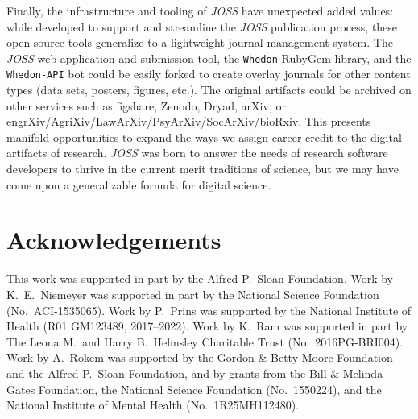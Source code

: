 \documentclass{article}
\newcommand\joss{\textit{JOSS}}
\begin{document}
Finally, the infrastructure and tooling of \joss{} have unexpected added values: while developed to
support and streamline the \joss{} publication process, these open-source tools generalize to a lightweight journal-management system.
The \joss{} web application and submission tool, the \texttt{Whedon} RubyGem library, and the \texttt{Whedon-API} bot could be easily forked to create overlay journals for other content types (data sets, posters, figures, etc.).
The original artifacts could be archived on other
services such as figshare, Zenodo, Dryad, arXiv, or engrXiv\slash AgriXiv\slash LawArXiv\slash PsyArXiv\slash SocArXiv\slash bioRxiv.
This presents manifold opportunities to expand the ways we assign career credit to the digital artifacts of research.
\joss{} was born to answer the needs of research software developers to thrive in the current merit traditions of science, but we may have come upon a generalizable formula for digital science.

\section*{Acknowledgements}

This work was supported in part by the Alfred P.\ Sloan Foundation.
Work by K.~E.~Niemeyer was supported in part by the National Science Foundation (No.\ ACI-1535065).
Work by P.~Prins was supported by the National Institute of Health (R01 GM123489, 2017--2022).
Work by K.~Ram was supported in part by The Leona M.\ and Harry B.~Helmsley Charitable Trust (No.\ 2016PG-BRI004).
Work by A.~Rokem was supported by the Gordon \& Betty Moore Foundation and
the Alfred P.~Sloan Foundation, and by grants from the Bill \& Melinda Gates
Foundation, the National Science Foundation (No.\ 1550224), and the National
Institute of Mental Health (No.\ 1R25MH112480).

\printbibliography
\end{document}
